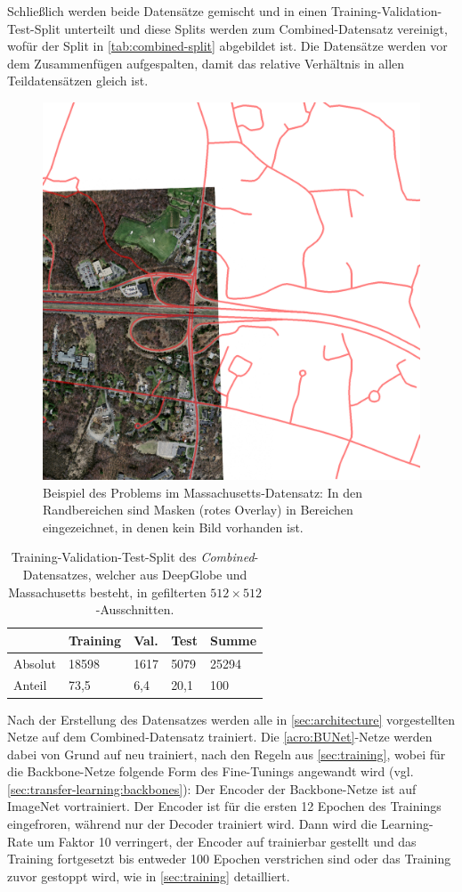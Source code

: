 Schließlich werden beide Datensätze gemischt und in einen Training-Validation-Test-Split unterteilt und diese Splits werden zum 
Combined-Datensatz vereinigt, wofür der Split in \autoref{tab:combined-split} abgebildet ist. 
Die Datensätze werden vor dem Zusammenfügen aufgespalten, damit das relative Verhältnis in allen Teildatensätzen gleich ist.  

\begin{figure}
	\centering
	\includegraphics[width=.5\textwidth]{Bilder/problem_mass.png} 
	\caption{Beispiel des Problems im Massachusetts-Datensatz: In den Randbereichen sind Masken (rotes Overlay) in Bereichen eingezeichnet, 
	in denen kein Bild vorhanden ist.}
	\label{fig:problem-mass}
\end{figure} 

\begin{table}[ht]
	\centering
	\begin{tabular}{l|l|l|l|l}
		& Training & Val. & Test & Summe \\
		\midrule
		Absolut & 18598 & 1617 & 5079 & 25294 \\
		Anteil & 73,5 & 6,4 & 20,1 & 100 \\ 
	\end{tabular}
	\caption{Training-Validation-Test-Split des \textit{Combined}-Datensatzes, welcher aus DeepGlobe und Massachusetts besteht, 
	in gefilterten $512{\times}512$-Ausschnitten.}
	\label{tab:combined-split}
\end{table}

Nach der Erstellung des Datensatzes werden alle in \autoref{sec:architecture} vorgestellten Netze
auf dem Combined-Datensatz trainiert. 
Die \autoref{acro:BUNet}-Netze werden dabei von Grund auf neu trainiert, nach den Regeln aus \autoref{sec:training}, 
wobei für die Backbone-Netze folgende Form des Fine-Tunings angewandt wird (vgl. \autoref{sec:transfer-learning:backbones}): 
Der Encoder der Backbone-Netze ist auf ImageNet vortrainiert. Der Encoder ist für die ersten 12 Epochen des Trainings eingefroren, 
während nur der Decoder trainiert wird. Dann  wird die Learning-Rate um Faktor 10 verringert, der Encoder 
auf trainierbar gestellt und das Training fortgesetzt bis entweder 100 Epochen verstrichen sind oder das Training 
zuvor gestoppt wird, wie in \autoref{sec:training} detailliert.    

